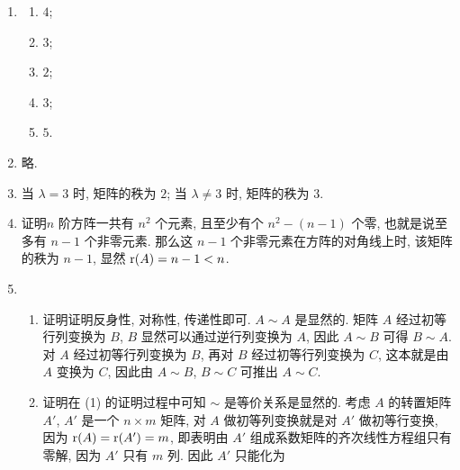 % 
\begin{enumerate}
    \item %
        \begin{multicols}{5}
            \begin{enumerate}[(1)]
                \item %
                    $4$;
                \item %
                    $3$;
                \item %
                    $2$;
                \item %
                    $3$;
                \item %
                    $5$.
            \end{enumerate}
        \end{multicols}
    \item %
        略.
    \item %
        当 $\lambda = 3$ 时, 矩阵的秩为 $2$; 当 $\lambda \neq 3$ 时, 矩阵的秩为 $3$.
    \item %
        {\heiti 证明}\quad $n$ 阶方阵一共有 $n^2$ 个元素, 且至少有个 $n^2 - (n-1)$ 个零, 也就是说至多有 $n - 1$ 个非零元素.
        那么这 $n - 1$ 个非零元素在方阵的对角线上时, 该矩阵的秩为 $n - 1$, 显然 $\mathrm{r}(A) = n - 1 < n$.
    \item %
        \begin{enumerate}[(1)]
            \item %
                {\heiti 证明}\quad 证明反身性, 对称性, 传递性即可. $A \sim A$ 是显然的.
                矩阵 $A$ 经过初等行列变换为 $B$, $B$ 显然可以通过逆行列变换为 $A$, 因此 $A \sim B$ 可得 $B \sim A$.
                对 $A$ 经过初等行列变换为 $B$, 再对 $B$ 经过初等行列变换为 $C$, 这本就是由 $A$ 变换为 $C$, 因此由 $A \sim B$, $B \sim C$ 可推出 $A \sim C$.
            \item %
                {\heiti 证明}\quad 在 (1) 的证明过程中可知 $\sim$ 是等价关系是显然的.
                考虑 $A$ 的转置矩阵 $A'$, $A'$ 是一个 $n \times m$ 矩阵, 对 $A$ 做初等列变换就是对 $A'$ 做初等行变换, 因为 $\mathrm{r}(A) = \mathrm{r}(A') = m$, 即表明由 $A'$ 组成系数矩阵的齐次线性方程组只有零解, 因为 $A'$ 只有 $m$ 列.
                因此 $A'$ 只能化为
                \[
\]
\end{enumerate}
\end{enumerate}
